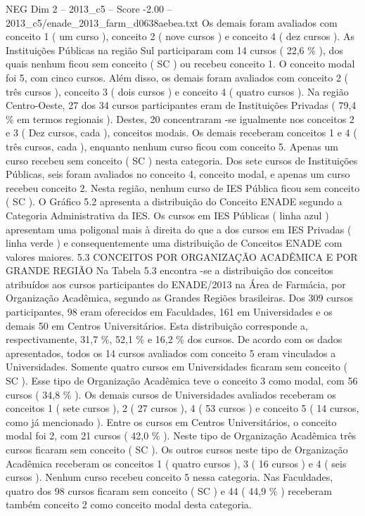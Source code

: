 \begin{textsample}{NEG Dim 2 – 2013\_c5 – Score -2.00 – 2013\_c5/enade\_2013\_farm\_d0638aebea.txt}
Os demais foram avaliados com conceito 1 ( um curso ), conceito 2 ( nove cursos ) e conceito 4 ( dez cursos ).
As Instituições Públicas na região Sul participaram com 14 cursos ( 22,6 \% ), dos quais nenhum ficou sem conceito ( SC ) ou recebeu conceito 1.
O conceito modal foi 5, com cinco cursos.
Além disso, os demais foram avaliados com conceito 2 ( três cursos ), conceito 3 ( dois cursos ) e conceito 4 ( quatro cursos ).
Na região Centro-Oeste, 27 dos 34 cursos participantes eram de Instituições Privadas ( 79,4 \% em termos regionais ).
Destes, 20 concentraram -se igualmente nos conceitos 2 e 3 ( Dez cursos, cada ), conceitos modais.
Os demais receberam conceitos 1 e 4 ( três cursos, cada ), enquanto nenhum curso ficou com conceito 5.
Apenas um curso recebeu sem conceito ( SC ) nesta categoria.
Dos sete cursos de Instituições Públicas, seis foram avaliados no conceito 4, conceito modal, e apenas um curso recebeu conceito 2.
Nesta região, nenhum curso de IES Pública ficou sem conceito ( SC ).
O Gráfico 5.2 apresenta a distribuição do Conceito ENADE segundo a Categoria Administrativa da IES.
Os cursos em IES Públicas ( linha azul ) apresentam uma poligonal mais à direita do que a dos cursos em IES Privadas ( linha verde ) e consequentemente uma distribuição de Conceitos ENADE com valores maiores. 5.3 CONCEITOS POR ORGANIZAÇÃO ACADÊMICA E POR GRANDE REGIÃO Na Tabela 5.3 encontra -se a distribuição dos conceitos atribuídos aos cursos participantes do ENADE/2013 na Área de Farmácia, por Organização Acadêmica, segundo as Grandes Regiões brasileiras.
Dos 309 cursos participantes, 98 eram oferecidos em Faculdades, 161 em Universidades e os demais 50 em Centros Universitários.
Esta distribuição corresponde a, respectivamente, 31,7 \%, 52,1 \% e 16,2 \% dos cursos.
De acordo com os dados apresentados, todos os 14 cursos avaliados com conceito 5 eram vinculados a Universidades.
Somente quatro cursos em Universidades ficaram sem conceito ( SC ).
Esse tipo de Organização Acadêmica teve o conceito 3 como modal, com 56 cursos ( 34,8 \% ).
Os demais cursos de Universidades avaliados receberam os conceitos 1 ( sete cursos ), 2 ( 27 cursos ), 4 ( 53 cursos ) e conceito 5 ( 14 cursos, como já mencionado ).
Entre os cursos em Centros Universitários, o conceito modal foi 2, com 21 cursos ( 42,0 \% ).
Neste tipo de Organização Acadêmica três cursos ficaram sem conceito ( SC ).
Os outros cursos neste tipo de Organização Acadêmica receberam os conceitos 1 ( quatro cursos ), 3 ( 16 cursos ) e 4 ( seis cursos ).
Nenhum curso recebeu conceito 5 nessa categoria.
Nas Faculdades, quatro dos 98 cursos ficaram sem conceito ( SC ) e 44 ( 44,9 \% ) receberam também conceito 2 como conceito modal desta categoria.

\end{textsample}

